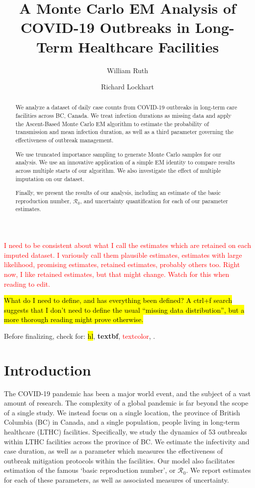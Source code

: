 \documentclass[11pt, oneside]{article}   	%
\title{A Monte Carlo EM Analysis of COVID-19 Outbreaks in Long-Term Healthcare Facilities}
\author[1]{William Ruth}
\author[2]{Richard Lockhart}
\affil[1]{Corresponding Author - Department of Statistics and Actuarial Science \\ Simon Fraser University \\ Burnaby, BC  Canada \\ wruth@sfu.ca}
\affil[2]{Department of Statistics and Actuarial Science \\ Simon Fraser University \\ Burnaby, BC  Canada}
\date{}
\newcommand{\RO}{\mathscr{R}_0}	%
\begin{document}
\maketitle


\begin{abstract}
	We analyze a dataset of daily case counts from COVID-19 outbreaks in long-term care facilities across BC, Canada. We treat infection durations as missing data and apply the Ascent-Based Monte Carlo EM algorithm to estimate the probability of transmission and mean infection duration, as well as a third parameter governing the effectiveness of outbreak management. 

	We use truncated importance sampling to generate Monte Carlo samples for our analysis. We use an innovative application of a simple EM identity to compare results across multiple starts of our algorithm. We also investigate the effect of multiple imputation on our dataset.

	Finally, we present the results of our analysis, including an estimate of the basic reproduction number, $\RO$, and uncertainty quantification for each of our parameter estimates. 
\end{abstract}

\textcolor{red}{I need to be consistent about what I call the estimates which are retained on each imputed dataset. I variously call them plausible estimates, estimates with large likelihood, promising estimates, retained estimates, probably others too. Right now, I like retained estimates, but that might change. Watch for this when reading to edit.}

\hl{What do I need to define, and has everything been defined? A ctrl+f search suggests that I don't need to define the usual ``missing data distribution'', but a more thorough reading might prove otherwise.}

Before finalizing, check for: \hl{hl}, \textbf{textbf}, \textcolor{red}{textcolor}, \citep{need}.

\section{Introduction}
The COVID-19 pandemic has been a major world event, and the subject of a vast amount of research. The complexity of a global pandemic is far beyond the scope of a single study. We instead focus on a single location, the province of British Columbia (BC) in Canada, and a single population, people living in long-term healthcare (LTHC) facilities. Specifically, we study the dynamics of 53 outbreaks within LTHC facilities across the province of BC. We estimate the infectivity and case duration, as well as a parameter which measures the effectiveness of outbreak mitigation protocols within the facilities. Our model also facilitates estimation of the famous `basic reproduction number', or $\RO$. We report estimates for each of these parameters, as well as associated measures of uncertainty. 
\end{document}
